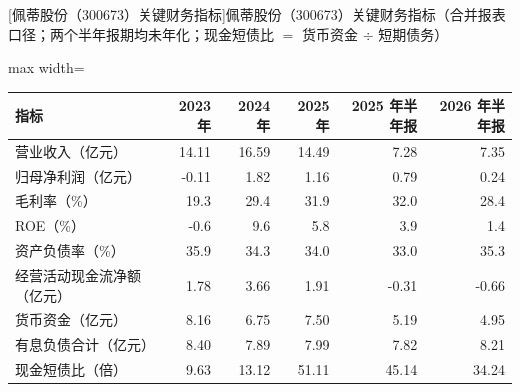 \begin{center}\small\setlength{\tabcolsep}{3.4pt}
[佩蒂股份（300673）关键财务指标]{佩蒂股份（300673）关键财务指标（合并报表口径；两个半年报期均未年化；现金短债比 $=$ 货币资金 $\div$ 短期债务）}
\begin{adjustbox}{max width=\textwidth}
\begin{tabular}{@{}lrrrrr@{}}
\toprule
指标 & 2023 年 & 2024 年 & 2025 年 & 2025 年半年报 & 2026 年半年报 \\
\midrule
营业收入（亿元） & 14.11 & 16.59 & 14.49 & 7.28 & 7.35 \\
归母净利润（亿元） & -0.11 & 1.82 & 1.16 & 0.79 & 0.24 \\
毛利率（\%） & 19.3 & 29.4 & 31.9 & 32.0 & 28.4 \\
ROE（\%） & -0.6 & 9.6 & 5.8 & 3.9 & 1.4 \\
资产负债率（\%） & 35.9 & 34.3 & 34.0 & 33.0 & 35.3 \\
经营活动现金流净额（亿元） & 1.78 & 3.66 & 1.91 & -0.31 & -0.66 \\
货币资金（亿元） & 8.16 & 6.75 & 7.50 & 5.19 & 4.95 \\
有息负债合计（亿元） & 8.40 & 7.89 & 7.99 & 7.82 & 8.21 \\
现金短债比（倍） & 9.63 & 13.12 & 51.11 & 45.14 & 34.24 \\
\bottomrule
\end{tabular}
\end{adjustbox}
\end{center}

